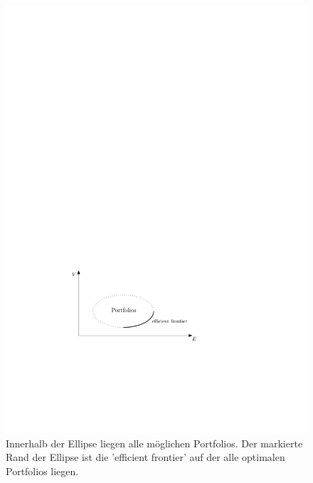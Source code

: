 \begin{figure}[h]
\centering
\includegraphics{efficientfrontier.pdf}
\caption[Efficient Frontier]{Innerhalb der Ellipse liegen alle möglichen Portfolios. Der markierte Rand der Ellipse ist die 'efficient frontier' auf der alle optimalen Portfolios liegen.}
\label{efficientfrontier}
\end{figure}
